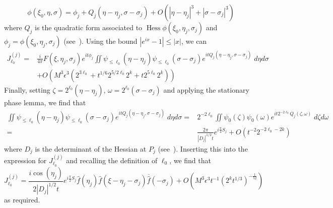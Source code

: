 \documentclass[letterpaper, reqno,final]{amsart}
\DeclareMathOperator{\Hess}{Hess}
\newcommand{\bigO}[1]{O\left({#1}\right)}
\newcommand{\stPhErr}{{\frac{1}{52}}}
\begin{document}
\begin{equation*}
    \phi(\xi_0,\eta,\sigma) = \phi_j + Q_j (\eta - \eta_j, \sigma - \sigma_j) + \bigO{|\eta - \eta_j|^3 + |\sigma - \sigma_j|^3}
\end{equation*}
where $Q_j$ is the quadratic form associated to $\Hess \phi(\xi_0, \eta_j, \sigma_j)$ and $\phi_j = \phi(\xi_0,\eta_j,\sigma_j)$ (see~).  Using the bound $|e^{ix} - 1| \leq |x|$, we can 
\begin{equation*}\begin{split}
    J^{(j)}_{\ell_0} =& \frac{i}{4\pi} F(\xi,\eta_j, \sigma_j) e^{it\phi_j} \iint \psi_{\leq \ell_0}(\eta - \eta_j) \psi_{\leq \ell_0}(\sigma - \sigma_j) e^{itQ_j(\eta - \eta_j, \sigma - \sigma_j)} \;d\eta d\sigma\\
    &+ \bigO{M^3\epsilon^3 \left(2^{3\ell_0} + t^{1/6}2^{5/2\ell_0}2^k + t 2^{5\ell_0}2^k\right)}
\end{split}\end{equation*}
Finally, setting $\zeta = 2^{\ell_0}(\eta - \eta_j)$, $\omega = 2^{\ell_0}(\sigma - \sigma_j)$ and applying the stationary phase lemma, we find that
\begin{equation*}\begin{split}
    \iint \psi_{\leq \ell_0}(\eta - \eta_j) \psi_{\leq \ell_0}(\sigma - \sigma_j) e^{itQ_j(\eta - \eta_j, \sigma - \sigma_j)} \;d\eta d\sigma =& 2^{-2\ell_0}\iint \psi_{0}(\zeta) \psi_{0}(\omega) e^{it2^{-2\ell_0}Q_j(\zeta, \omega)} \;d\zeta d\omega\\
    =& \frac{2\pi}{|D_j|^{1/2} t}e^{i\frac{\pi}{4} S_j} + \bigO{t^{-2}2^{-2\ell_0-2k}}
\end{split}\end{equation*}
where $D_j$ is the determinant of the Hessian at $P_j$ (see~).  Inserting this into the expression for $J^{(j)}_{\ell_0}$ and recalling the definition of $\ell_0$, we find that
\begin{equation}\label{eqn:I-bound-st-phase}
    J^{(j)}_{\ell_0} = \frac{i\cos(\eta_j)}{2|D_j|^{1/2}t}e^{i\frac{\pi}{2} S_j} \hat{f}(\eta_j) \hat{f}(\xi - \eta_j - \sigma_j) \overline{\hat{f}}(-\sigma_j) + \bigO{M^3\epsilon^3 t^{-1}(2^k t^{1/3})^{-\stPhErr}}
\end{equation}
as required.


	{} 
	
\end{document}

